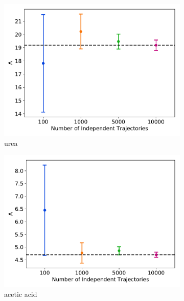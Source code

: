 \documentclass{article}
\begin{document}
  \begin{figure}
  \centering
  \begin{subfigure}{0.45\textwidth}
  \includegraphics[width=\textwidth]{flux_curves_Asensitivity_URE.pdf}
  \caption{urea}\label{fig:Asensitivity_URE}
  \end{subfigure}
  \begin{subfigure}{0.45\textwidth}
  \includegraphics[width=\textwidth]{flux_curves_Asensitivity_ACH.pdf}
  \caption{acetic acid}\label{fig:Asensitivity_ACH}
  \end{subfigure}
  \begin{subfigure}{0.45\textwidth}

\end{subfigure}
\end{figure}
\end{document}
